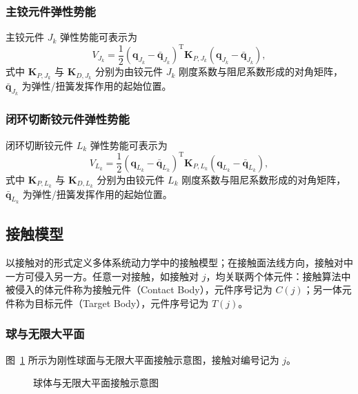 \subsubsection{主铰元件弹性势能}

主铰元件 $J_k$ 弹性势能可表示为
\begin{equation}\label{eq:11.70}
V_{J_k} = \frac{1}{2} (\boldsymbol{q}_{J_k} - \bar{\boldsymbol{q}}_{J_k})^{\mathrm{T}} \boldsymbol{K}_{P,J_k} (\boldsymbol{q}_{J_k} - \bar{\boldsymbol{q}}_{J_k}),
\end{equation}
式中 $\boldsymbol{K}_{P,J_k}$ 与 $\boldsymbol{K}_{D,J_k}$ 分别为由铰元件 $J_k$ 刚度系数与阻尼系数形成的对角矩阵，$\bar{\boldsymbol{q}}_{J_k}$ 为弹性/扭簧发挥作用的起始位置。

\subsubsection{闭环切断铰元件弹性势能}

闭环切断铰元件 $L_k$ 弹性势能可表示为
\begin{equation}\label{eq:11.71}
V_{L_k} = \frac{1}{2} (\boldsymbol{q}_{L_k} - \bar{\boldsymbol{q}}_{L_k})^{\mathrm{T}} \boldsymbol{K}_{P,L_k} (\boldsymbol{q}_{L_k} - \bar{\boldsymbol{q}}_{L_k}),
\end{equation}
式中 $\boldsymbol{K}_{P,L_k}$ 与 $\boldsymbol{K}_{D,L_k}$ 分别为由铰元件 $L_k$ 刚度系数与阻尼系数形成的对角矩阵，$\bar{\boldsymbol{q}}_{L_k}$ 为弹性/扭簧发挥作用的起始位置。

\subsection{接触模型}

以接触对的形式定义多体系统动力学中的接触模型；在接触面法线方向，接触对中一方可侵入另一方。任意一对接触，如接触对 $j$，均关联两个体元件：接触算法中被侵入的体元件称为接触元件（Contact Body），元件序号记为 $C(j)$；另一体元件称为目标元件（Target Body），元件序号记为 $T(j)$。

\subsubsection{球与无限大平面}

图~\ref{fig:11.5} 所示为刚性球面与无限大平面接触示意图，接触对编号记为 $j$。

\begin{figure}[htbp]
\centering
\caption{球体与无限大平面接触示意图}
\label{fig:11.5}
\end{figure}

